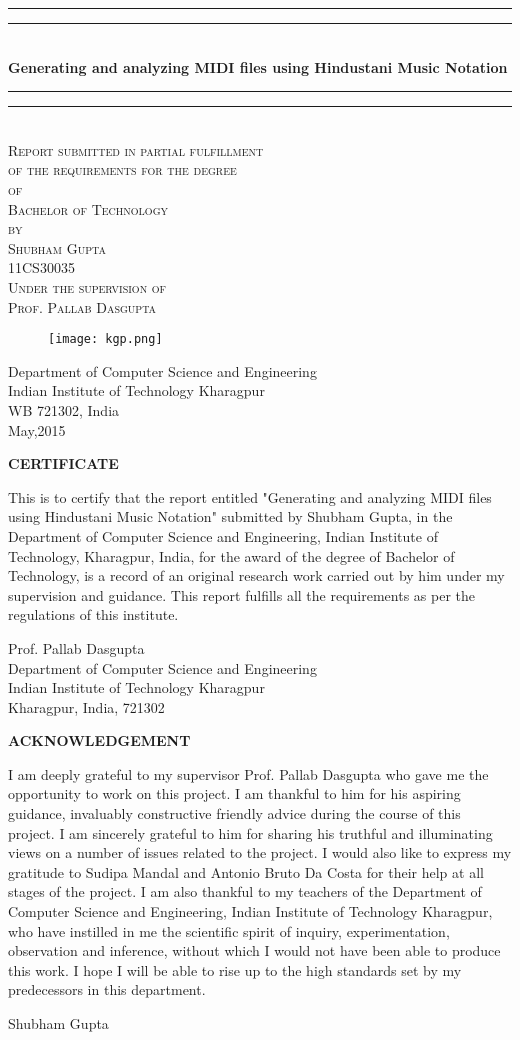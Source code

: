 \documentclass[12pt,a4paper]{article}
\newcommand*{\titleGP}{\begingroup %
\centering %
\vspace*{\baselineskip} %
\nocite{*}
\rule{\textwidth}{1.6pt}\vspace*{-\baselineskip}\vspace*{2pt} %
\rule{\textwidth}{0.4pt}\\[\baselineskip] %

{\Huge \textbf{Generating and analyzing MIDI files using Hindustani Music Notation }\\
\vspace{10pt}}
{}
\vspace{10pt}

\rule{\textwidth}{0.4pt}\vspace*{-\baselineskip}\vspace{3.2pt} %
\rule{\textwidth}{1.6pt}\\[\baselineskip] %

\scshape %
Report submitted in partial fulfillment\\ 
of the requirements for the degree\\
of\\
Bachelor of Technology\\
by\\
Shubham Gupta\\
11CS30035\\
\vspace{12pt}
Under the supervision of\\
Prof. Pallab Dasgupta\\
[\baselineskip] %
\begin{figure}[!htb]
\centering
\texttt{[image: kgp.png]}
\end{figure}
Department of Computer Science and Engineering\\
Indian Institute of Technology Kharagpur\\
WB 721302, India\\
\vspace{12pt}
May,2015\par %

\vspace*{2\baselineskip} %

\vspace*{2\baselineskip} %



\vfill %



\endgroup}
\begin{document}
\titleGP
\newpage
\begin{center}
{\Huge\textbf{CERTIFICATE}}
\end{center}
\vspace{12pt}
{}This is to certify that the report entitled "Generating and analyzing MIDI files using Hindustani Music Notation" submitted by Shubham Gupta, in the Department of Computer Science and Engineering, Indian Institute of Technology, Kharagpur, India, for the award of the degree of Bachelor of Technology, is a record of an original research work carried out by him under my supervision and guidance. This report fulfills all the requirements as per the regulations  of this institute. 
\begin{flushright}
\vspace{50pt}
Prof. Pallab Dasgupta\\
Department of Computer Science and Engineering\\
Indian Institute of Technology Kharagpur\\
Kharagpur, India, 721302
\end{flushright}
\newpage
\begin{center}
{\Huge\textbf{ACKNOWLEDGEMENT}}
\end{center}
\vspace{12pt}
{}I am deeply grateful to my supervisor Prof. Pallab Dasgupta who gave me the opportunity to work on this project. I am thankful to him for his aspiring guidance, invaluably constructive friendly advice during the course of this project. I am sincerely grateful to him for sharing his truthful and illuminating views on a number of issues related to the project. I would also like to express my gratitude to Sudipa Mandal and Antonio Bruto Da Costa for their help at all stages of the project.
\newline
I am also thankful to my teachers of the Department of Computer Science and Engineering, Indian Institute of Technology Kharagpur, who have instilled in me the scientific spirit of inquiry, experimentation, observation and inference, without which I would not have been able to produce this work. I hope I will be able to rise up to the high standards set by my predecessors in this department.

\begin{flushright}
\vspace{50pt}
Shubham Gupta
\end{flushright}

\newpage
\tableofcontents


\newpage
\end{document}
